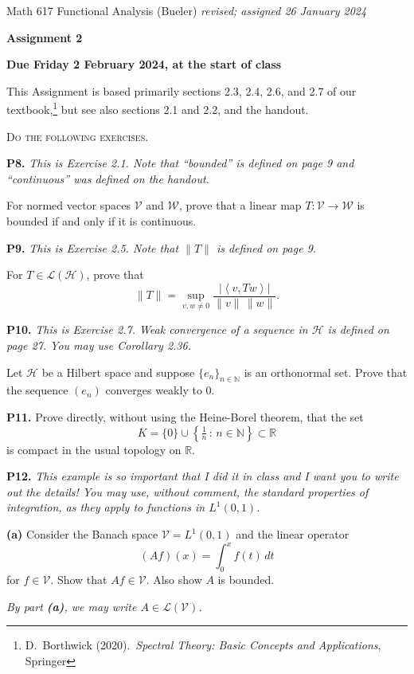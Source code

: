 \documentclass[12pt]{amsart}
\newcommand{\cH}{\mathcal{H}}
\newcommand{\cL}{\mathcal{L}}
\newcommand{\cV}{\mathcal{V}}
\newcommand{\cW}{\mathcal{W}}
\newcommand{\NN}{\mathbb{N}}
\newcommand{\RR}{\mathbb{R}}
\newcommand{\ip}[2]{\ensuremath{\left<#1,#2\right>}}
\newcommand{\prob}[1]{\bigskip\noindent\textbf{#1.}\quad }
\newcommand{\epart}[1]{\medskip\noindent\textbf{(#1)}\quad }
\newcommand{\nex}{\medskip\noindent}
\begin{document}
\scriptsize \noindent Math 617 Functional Analysis (Bueler) \hfill \emph{revised; assigned 26 January 2024}
\normalsize\medskip

\Large\centerline{\textbf{Assignment 2}}
\large
\medskip

\centerline{\textbf{Due Friday 2 February 2024, at the start of class}}
\medskip
\normalsize

\thispagestyle{empty}

\bigskip
\noindent This Assignment is based primarily sections 2.3, 2.4, 2.6, and 2.7 of our textbook,\footnote{D.~Borthwick (2020).~\emph{Spectral Theory: Basic Concepts and Applications}, Springer} but see also sections 2.1 and 2.2, and the handout.

\medskip
\noindent \textsc{Do the following exercises.}
\smallskip

\prob{P8}  \emph{This is Exercise 2.1.  Note that ``bounded'' is defined on page 9 and ``continuous'' was defined on the handout.}

\nex For normed vector spaces $\cV$ and $\cW$, prove that a linear map $T:\cV\to\cW$ is bounded if and only if it is continuous.


\prob{P9}  \emph{This is Exercise 2.5.  Note that $\|T\|$ is defined on page 9.}

\nex For $T\in\cL(\cH)$, prove that
	$$\|T\| = \sup_{v,w\ne 0} \frac{|\ip{v}{Tw}|}{\|v\|\,\|w\|}.$$


\prob{P10}  \emph{This is Exercise 2.7.  Weak convergence of a sequence in $\cH$ is defined on page 27.  You may use Corollary 2.36.}

\nex Let $\cH$ be a Hilbert space and suppose $\{e_n\}_{n\in\NN}$ is an orthonormal set.  Prove that the sequence $(e_n)$ converges weakly to 0. 


\prob{P11}  Prove directly, without using the Heine-Borel theorem, that the set
	$$K = \{0\} \cup \left\{\tfrac{1}{n}\,:\,n \in \NN\right\} \subset \RR$$
is compact in the usual topology on $\RR$.


\clearpage \newpage
\prob{P12}  \emph{This example is so important that I did it in class \emph{and} I want you to write out the details!  You may use, without comment, the standard properties of integration, as they apply to functions in $L^1(0,1)$.}

\epart{a}  Consider the Banach space $\cV = L^1(0,1)$ and the linear operator
	$$(Af)(x) = \int_0^x f(t)\,dt$$
for $f\in\cV$.  Show that $Af \in \cV$.  Also show $A$ is bounded.

\nex \emph{By part \emph{\textbf{(a)}}, we may write $A\in\cL(\cV)$.}
\end{document}
